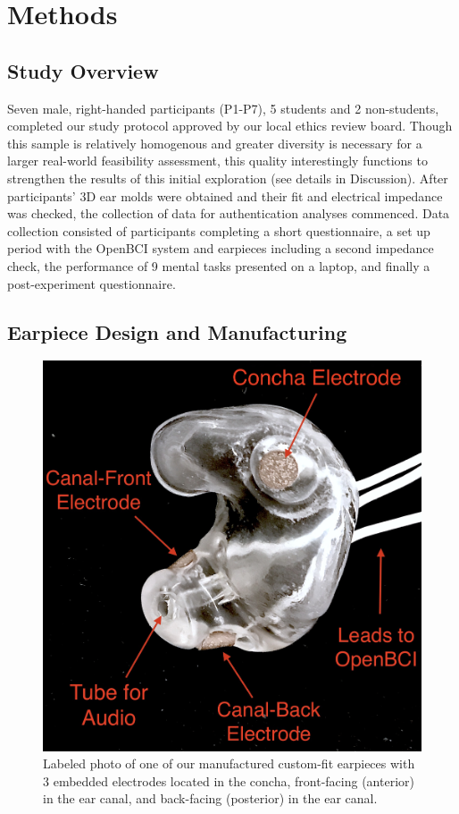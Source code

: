 \documentclass{sigchi}
\begin{document}
\section{Methods}

\subsection{Study Overview}

Seven male, right-handed participants (P1-P7), 5 students and 2 non-students, completed our study protocol approved by our local ethics review board. Though this sample is relatively homogenous and greater diversity is necessary for a larger real-world feasibility assessment, this quality interestingly functions to strengthen the results of this initial exploration (see details in Discussion). After participants' 3D ear molds were obtained and their fit and electrical impedance was checked, the collection of data for authentication analyses commenced. Data collection consisted of participants completing a short questionnaire, a set up period with the OpenBCI system and earpieces including a second impedance check, the performance of 9 mental tasks presented on a laptop, and finally a post-experiment questionnaire.

\subsection{Earpiece Design and Manufacturing}

\begin{figure}[htbp]
\centering
\includegraphics[width=.75\linewidth]{./figures/CFEEEG_piecefig_Right.jpg}
\caption{Labeled photo of one of our manufactured custom-fit earpieces with 3 embedded electrodes located in the concha, front-facing (anterior) in the ear canal, and back-facing (posterior) in the ear canal.}
\label{fig:earpiece_diagram}
\end{figure}
\end{document}
